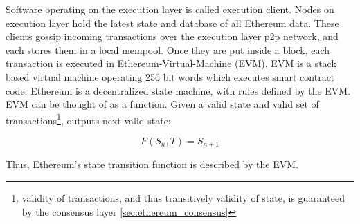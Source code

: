 Software operating on the execution layer is called execution client. Nodes on
execution layer hold the latest state and database of all Ethereum data. These
clients gossip incoming transactions over the execution layer p2p network, and
each stores them in a local mempool. Once they are put inside a block, each
transaction is executed in Ethereum-Virtual-Machine (EVM). EVM is a stack based
virtual machine operating 256 bit words which executes smart contract code.
Ethereum is a decentralized state machine, with rules defined by the EVM.
EVM can be thought of as a function. Given a valid state and valid set of
transactions\footnote{validity of transactions, and thus transitively validity
of state, is guaranteed by the consensus layer \ref{sec:ethereum_consensus}},
outputs next valid state:

\[
F(S_n, T) = S_{n+1}
\]

Thus, Ethereum's state transition function is described by the EVM. \cite{ethereumEthereumVirtual}


